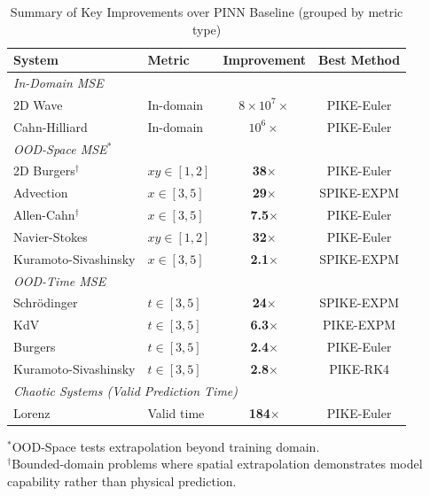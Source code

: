 \documentclass{article}
\theoremstyle{remark}
\begin{document}
\begin{table}[!htb]
\centering
\caption{Summary of Key Improvements over PINN Baseline (grouped by metric type)}
\label{tab:summary_results}
\begin{tabular}{llcc}
\toprule
System & Metric & Improvement & Best Method \\
\midrule
\multicolumn{4}{l}{\textit{In-Domain MSE}} \\
2D Wave & In-domain & \textbf{$8 \times 10^7\times$} & PIKE-Euler \\
Cahn-Hilliard & In-domain & \textbf{$10^6\times$} & PIKE-Euler \\
\midrule
\multicolumn{4}{l}{\textit{OOD-Space MSE}$^*$} \\
2D Burgers$^\dagger$ & $xy \in [1,2]$ & \textbf{38$\times$} & PIKE-Euler \\
Advection & $x \in [3,5]$ & \textbf{29$\times$} & SPIKE-EXPM \\
Allen-Cahn$^\dagger$ & $x \in [3,5]$ & \textbf{7.5$\times$} & PIKE-Euler \\
Navier-Stokes & $xy \in [1,2]$ & \textbf{32$\times$} & PIKE-Euler \\
Kuramoto-Sivashinsky & $x \in [3,5]$ & \textbf{2.1$\times$} & SPIKE-EXPM \\
\midrule
\multicolumn{4}{l}{\textit{OOD-Time MSE}} \\
Schr\"odinger & $t \in [3,5]$ & \textbf{24$\times$} & SPIKE-EXPM \\
KdV & $t \in [3,5]$ & \textbf{6.3$\times$} & PIKE-EXPM \\
Burgers & $t \in [3,5]$ & \textbf{2.4$\times$} & PIKE-Euler \\
Kuramoto-Sivashinsky & $t \in [3,5]$ & \textbf{2.8$\times$} & PIKE-RK4 \\
\midrule
\multicolumn{4}{l}{\textit{Chaotic Systems (Valid Prediction Time)}} \\
Lorenz & Valid time & \textbf{184$\times$} & PIKE-Euler \\
\bottomrule
\end{tabular}
\vspace{0.3em}

\footnotesize{$^*$OOD-Space tests extrapolation beyond training domain.\\ $^\dagger$Bounded-domain problems where spatial extrapolation demonstrates model capability rather than physical prediction.}
\end{table}
\end{document}
